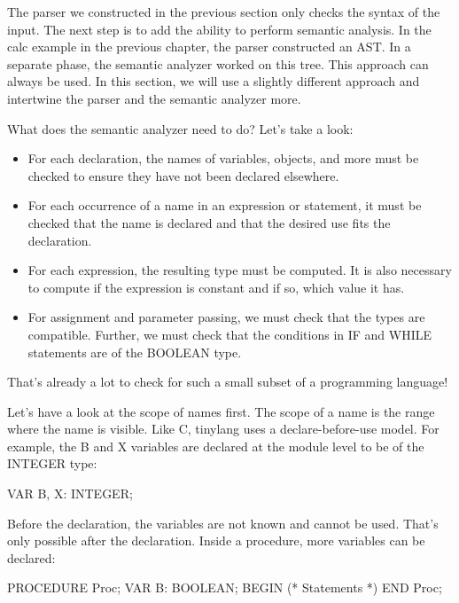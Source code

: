 
The parser we constructed in the previous section only checks the syntax of the input. The next step is to add the ability to perform semantic analysis. In the calc example in the previous chapter, the parser constructed an AST. In a separate phase, the semantic analyzer worked on this tree. This approach can always be used. In this section, we will use a slightly different approach and intertwine the parser and the semantic analyzer more.

What does the semantic analyzer need to do? Let’s take a look:

\begin{itemize}
\item
For each declaration, the names of variables, objects, and more must be checked to ensure they have not been declared elsewhere.

\item
For each occurrence of a name in an expression or statement, it must be checked that the name is declared and that the desired use fits the declaration.

\item
For each expression, the resulting type must be computed. It is also necessary to compute if the expression is constant and if so, which value it has.

\item
For assignment and parameter passing, we must check that the types are compatible. Further, we must check that the conditions in IF and WHILE statements are of the BOOLEAN type.
\end{itemize}

That’s already a lot to check for such a small subset of a programming language!


Let’s have a look at the scope of names first. The scope of a name is the range where the name is visible. Like C, tinylang uses a declare-before-use model. For example, the B and X variables are declared at the module level to be of the INTEGER type:

\begin{shell}
VAR B, X: INTEGER;
\end{shell}

Before the declaration, the variables are not known and cannot be used. That’s only possible after the declaration. Inside a procedure, more variables can be declared:

\begin{shell}
PROCEDURE Proc;
VAR B: BOOLEAN;
BEGIN
    (* Statements *)
END Proc;
\end{shell}

